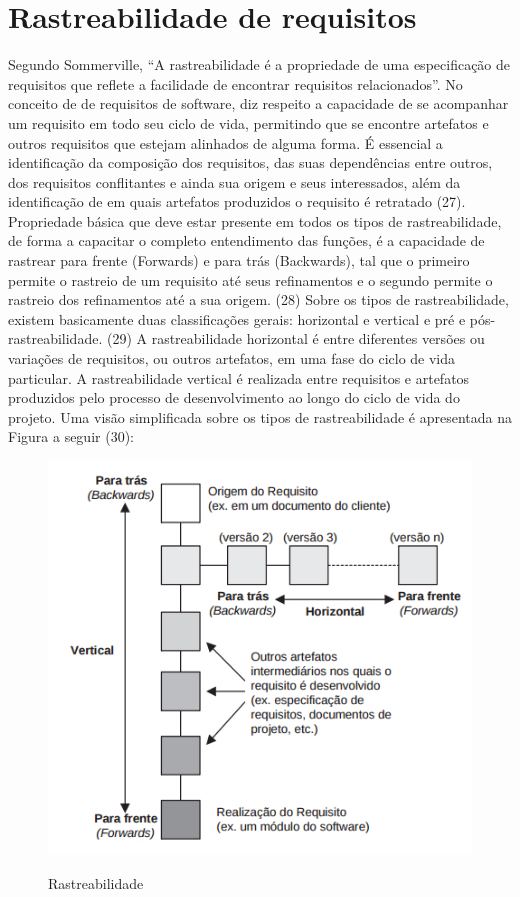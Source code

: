 \section{Rastreabilidade de requisitos}

Segundo Sommerville, “A rastreabilidade é a propriedade de uma especificação de requisitos que reflete a facilidade de encontrar requisitos relacionados”. No conceito de de requisitos de software, diz respeito a capacidade de se acompanhar um requisito em todo seu ciclo de vida, permitindo que se encontre artefatos e outros requisitos que estejam alinhados de alguma forma. É essencial a identificação da composição dos requisitos, das suas dependências entre outros, dos requisitos conflitantes e ainda sua origem e seus interessados, além da identificação de em quais artefatos produzidos o requisito é retratado (27).
Propriedade básica que deve estar presente em todos os tipos de rastreabilidade, de forma a capacitar o completo entendimento das funções, é a capacidade de rastrear para frente (Forwards) e para trás (Backwards), tal que o primeiro permite o rastreio de um requisito até seus refinamentos e  o segundo permite o rastreio dos refinamentos até a sua origem. (28)
Sobre os tipos de rastreabilidade, existem basicamente duas classificações gerais: horizontal e vertical e pré e pós-rastreabilidade. (29)
A rastreabilidade horizontal é entre diferentes versões ou variações de requisitos, ou outros artefatos, em uma fase do ciclo de vida particular. A rastreabilidade vertical é realizada entre requisitos e artefatos produzidos pelo processo de desenvolvimento ao longo do ciclo de vida do projeto.
Uma visão simplificada sobre os tipos de rastreabilidade é apresentada na Figura a seguir (30):

\FloatBarrier
\begin{figure}[!htpd]
		\centering
		\caption{Rastreabilidade}
		\includegraphics[scale=0.8]{figuras/Rastreabilidade}
		\label{img:SAF}
\end{figure}
\FloatBarrier

